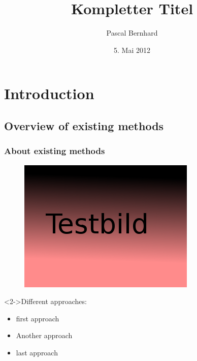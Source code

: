 \documentclass{beamer}
\title[kurzer Titel]{Kompletter Titel}
\author[Pascal Bernhard]{Pascal Bernhard}
\institute[BeLUG]{Berliner Linux User Group}
\date{5. Mai 2012}
\begin{document}
 


\frame{\titlepage}
 
\frame{\tableofcontents}

\section{Introduction}
\subsection[Overview]{Overview of existing methods}
\begin{frame}
\frametitle{About existing methods}
 
\begin{figure}[\ht]
\includegraphics[scale=0.2]{testpic.png}
\end{figure}
 
\begin{block}<2->{Different approaches:}
\begin{itemize}
\item<2-> first approach
\item<3-> Another approach
\item<4-> last approach
\end{itemize}
\end{block}
\end{frame}
\end{document}
